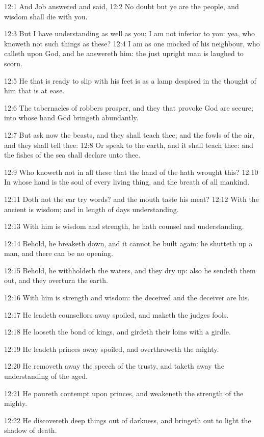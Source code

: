 12:1 And Job answered and said, 12:2 No doubt but ye are the people, and wisdom shall die with you.

12:3 But I have understanding as well as you; I am not inferior to you: yea, who knoweth not such things as these?  12:4 I am as one mocked of his neighbour, who calleth upon God, and he answereth him: the just upright man is laughed to scorn.

12:5 He that is ready to slip with his feet is as a lamp despised in the thought of him that is at ease.

12:6 The tabernacles of robbers prosper, and they that provoke God are secure; into whose hand God bringeth abundantly.

12:7 But ask now the beasts, and they shall teach thee; and the fowls of the air, and they shall tell thee: 12:8 Or speak to the earth, and it shall teach thee: and the fishes of the sea shall declare unto thee.

12:9 Who knoweth not in all these that the hand of the \LORD hath wrought this?  12:10 In whose hand is the soul of every living thing, and the breath of all mankind.

12:11 Doth not the ear try words? and the mouth taste his meat?  12:12 With the ancient is wisdom; and in length of days understanding.

12:13 With him is wisdom and strength, he hath counsel and understanding.

12:14 Behold, he breaketh down, and it cannot be built again: he shutteth up a man, and there can be no opening.

12:15 Behold, he withholdeth the waters, and they dry up: also he sendeth them out, and they overturn the earth.

12:16 With him is strength and wisdom: the deceived and the deceiver are his.

12:17 He leadeth counsellors away spoiled, and maketh the judges fools.

12:18 He looseth the bond of kings, and girdeth their loins with a girdle.

12:19 He leadeth princes away spoiled, and overthroweth the mighty.

12:20 He removeth away the speech of the trusty, and taketh away the understanding of the aged.

12:21 He poureth contempt upon princes, and weakeneth the strength of the mighty.

12:22 He discovereth deep things out of darkness, and bringeth out to light the shadow of death.

